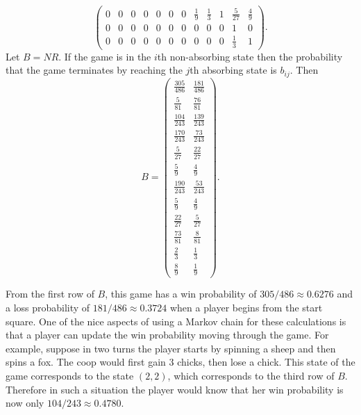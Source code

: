 \documentclass[12pt]{article}
\begin{document}
\begin{example}
\[\begin{pmatrix}
            0   & 0     & 0     & 0     & 0     & 0     & 0     & \frac{1}
            {9} & \frac{1}{3}   & 1     & \frac{5}{27}  & \frac{4}{9}\\
            0   & 0     & 0     & 0     & 0     & 0     & 0     & 0
            & 0 & 0     & 1     & 0\\
            0   & 0     & 0     & 0     & 0     & 0     & 0     & 0
            & 0 & 0     & \frac{1}{3}   & 1
        \end{pmatrix}
        .
    \]%
    Let \( B = N R \).  If the game is in the \( i \)th non-absorbing
    state then the probability that the game terminates by reaching the \(
    j \)th absorbing state is \( b_{ij} \).  Then
    \[
        B =
        \begin{pmatrix}
            \frac{305}{486}     & \frac{181}{486}\\
            \frac{5}{81}        & \frac{76}{81}\\
            \frac{104}{243}     & \frac{139}{243}\\
            \frac{170}{243}     & \frac{73}{243}\\
            \frac{5}{27}        & \frac{22}{27}\\
            \frac{5}{9} & \frac{4}{9}\\
            \frac{190}{243}     & \frac{53}{243}\\
            \frac{5}{9} & \frac{4}{9}\\
            \frac{22}{27}       & \frac{5}{27}\\
            \frac{73}{81}       & \frac{8}{81}\\
            \frac{2}{3} & \frac{1}{3}\\
            \frac{8}{9} & \frac{1}{9}
        \end{pmatrix}
        .
    \]
\end{example}
From the first row of \( B \), this game has a win probability of \(
305/486 \approx 0.6276 \) and a loss probability of \( 181/486 \approx
0.3724 \) when a player begins from the start square.  One of the nice
aspects of using a Markov chain for these calculations is that a player
can update the win probability moving through the game.  For example,
suppose in two turns the player starts by spinning a sheep and then
spins a fox.  The coop would first gain \( 3 \) chicks, then lose a
chick. This state of the game corresponds to the state \( (2, 2) \),
which corresponds to the third row of \( B \).  Therefore in such a
situation the player would know that her win probability is now only \(
104/243 \approx 0.4780 \).
\end{document}

